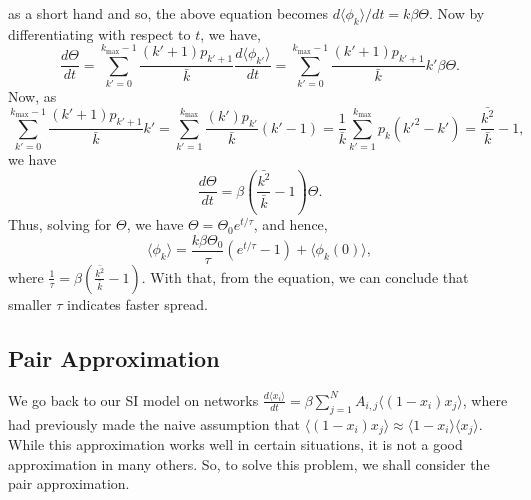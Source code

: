 \documentclass[
]{article}
\theoremstyle{definition}
\theoremstyle{definition}
\begin{document}
as a short hand and so, the above equation becomes
\(d\langle \phi_k \rangle / dt = k\beta \Theta\). Now by differentiating
with respect to \(t\), we have,
\[\frac{d\Theta}{dt} = \sum_{k' = 0}^{k_{\max} - 1} \frac{(k' + 1) p_{k' + 1}}{\bar{k}}
\frac{d\langle \phi_{k'} \rangle }{dt} = \sum_{k' = 0}^{k_{\max} - 1} 
\frac{(k' + 1) p_{k' + 1}}{\bar{k}}k'\beta \Theta.\] Now, as
\[\sum_{k' = 0}^{k_{\max} - 1} \frac{(k' + 1) p_{k' + 1}}{\bar{k}}k' = 
  \sum_{k' = 1}^{k_{\max}} \frac{(k') p_{k'}}{\bar{k}}(k' - 1) = \frac{1}{\bar{k}} 
  \sum_{k' = 1}^{k_{\max}}p_k(k'^2- k') = \frac{\bar{k^2}}{\bar{k}} - 1,\]
we have
\[\frac{d\Theta}{dt} = \beta \left(\frac{\bar{k^2}}{\bar{k}} - 1\right) \Theta.\]
Thus, solving for \(\Theta\), we have
\(\Theta = \Theta_0 e^{t / \tau}\), and hence,
\[\langle \phi_k \rangle = \frac{k\beta\Theta_0}{\tau}(e^{t / \tau} - 1) + 
  \langle \phi_k(0) \rangle,\] where
\(\frac{1}{\tau} = \beta(\frac{\bar{k^2}}{\bar{k}} - 1)\). With that,
from the equation, we can conclude that smaller \(\tau\) indicates
faster spread.

\hypertarget{pair-approximation}{%
\subsection{Pair Approximation}\label{pair-approximation}}

We go back to our SI model on networks
\(\frac{d\langle x_i \rangle}{dt} = \beta \sum_{j = 1}^N A_{i, j}\langle (1 - x_i)x_j \rangle\),
where had previously made the naive assumption that
\(\langle (1 - x_i)x_j \rangle \approx \langle 1 - x_i \rangle \langle x_j \rangle\).
While this approximation works well in certain situations, it is not a
good approximation in many others. So, to solve this problem, we shall
consider the pair approximation.
\end{document}
